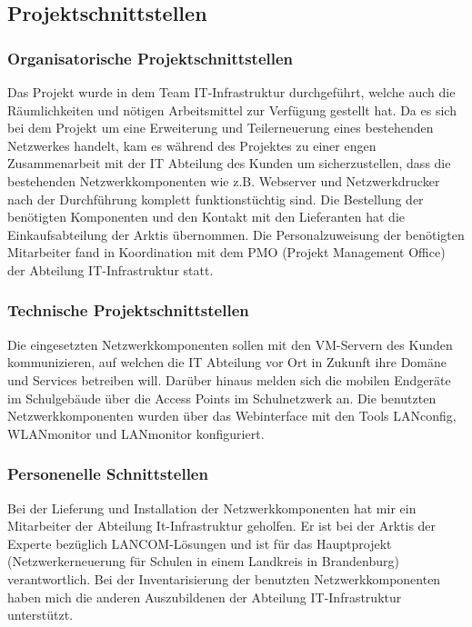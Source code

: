 \subsection{Projektschnittstellen} 
\label{sec:Projektschnittstellen}
\subsubsection{Organisatorische Projektschnittstellen}
Das Projekt wurde in dem Team IT-Infrastruktur durchgeführt, welche auch die Räumlichkeiten und nötigen Arbeitsmittel zur Verfügung gestellt hat. 
Da es sich bei dem Projekt um eine Erweiterung und Teilerneuerung eines bestehenden Netzwerkes handelt, kam es während des Projektes zu einer engen Zusammenarbeit mit der IT Abteilung des Kunden um sicherzustellen, dass die bestehenden Netzwerkkomponenten wie z.B. Webserver und Netzwerkdrucker nach der Durchführung komplett funktionstüchtig sind. 
Die Bestellung der benötigten Komponenten und den Kontakt mit den Lieferanten hat die Einkaufsabteilung der \ac{Arktis} übernommen. 
Die Personalzuweisung der benötigten Mitarbeiter fand in Koordination mit dem PMO (Projekt Management Office) der Abteilung IT-Infrastruktur statt.    
\subsubsection{Technische Projektschnittstellen}
Die eingesetzten Netzwerkkomponenten sollen mit den VM-Servern des Kunden kommunizieren, auf welchen die IT Abteilung vor Ort in Zukunft ihre Domäne und Services betreiben will. 
Darüber hinaus melden sich die mobilen Endgeräte im Schulgebäude über die Access Points im Schulnetzwerk an. 
Die benutzten Netzwerkkomponenten wurden über das Webinterface mit den Tools LANconfig, WLANmonitor und LANmonitor konfiguriert.
\subsubsection{Personenelle Schnittstellen}
Bei der Lieferung und Installation der Netzwerkkomponenten hat mir ein Mitarbeiter der Abteilung It-Infrastruktur geholfen. 
Er ist bei der \ac{Arktis} der Experte bezüglich LANCOM-Lösungen und ist für das Hauptprojekt (Netzwerkerneuerung für Schulen in einem Landkreis in Brandenburg) verantwortlich. 
Bei der Inventarisierung der benutzten Netzwerkkomponenten haben mich die anderen Auszubildenen der Abteilung IT-Infrastruktur unterstützt. 
\begin{comment}
	\item Mit welchen anderen Systemen interagiert die Anwendung (technische Schnittstellen)?
	\item Wer genehmigt das Projekt \bzw stellt Mittel zur Verfügung? 
	\item Wer sind die Benutzer der Anwendung?
	\item Wem muss das Ergebnis präsentiert werden?
\end{comment}


